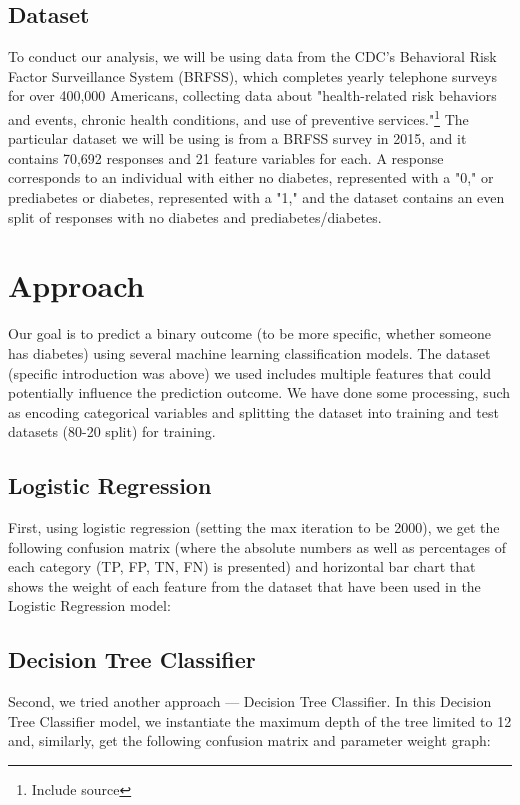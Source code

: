 \documentclass[12pt]{article}
\begin{document}
\subsection{Dataset}
To conduct our analysis, we will be using data from the CDC's Behavioral Risk Factor Surveillance System (BRFSS), which completes yearly telephone surveys for over 400,000 Americans, collecting data about "health-related risk behaviors and events, chronic health conditions, and use of preventive services."\footnote{Include source} The particular dataset we will be using is from a BRFSS survey in 2015, and it contains 70,692 responses and 21 feature variables for each. A response corresponds to an individual with either no diabetes, represented with a "0," or prediabetes or diabetes, represented with a "1," and the dataset contains an even split of responses with no diabetes and prediabetes/diabetes.

\section{Approach}
Our goal is to predict a binary outcome (to be more specific, whether someone has diabetes) using several machine learning classification models. The dataset (specific introduction was above) we used  includes multiple features that could potentially influence the prediction outcome. We have done some processing, such as  encoding categorical variables and splitting the dataset into training and test datasets (80-20 split) for training. 

\subsection{Logistic Regression}
First, using  logistic regression (setting the max iteration to be 2000), we get the following confusion matrix (where the absolute numbers as well as percentages of each category (TP, FP, TN, FN) is presented) and horizontal bar chart that shows the weight of each feature from the dataset that have been used in the Logistic Regression model:

\subsection{Decision Tree Classifier}
Second, we tried another approach — Decision Tree Classifier. In this Decision Tree Classifier model, we instantiate the maximum depth of the tree limited to 12 and, similarly, get the following confusion matrix and parameter weight graph:
\end{document}
